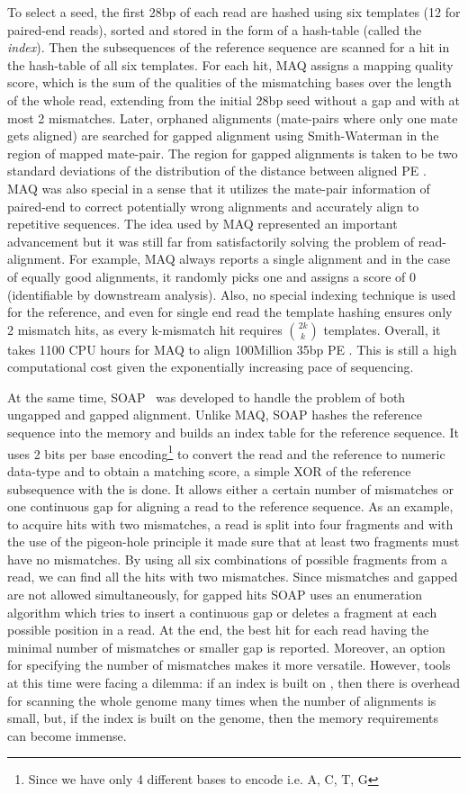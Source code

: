 To select a seed, the first 28bp of each read are hashed using six templates (12 for paired-end reads), sorted and stored in the form of a hash-table (called the \textit{index}). Then the subsequences of the reference sequence are scanned for a hit in the hash-table of all six templates. For each hit, MAQ assigns a mapping quality score, which is the sum of the qualities of the mismatching bases over the length of the whole read, extending from the initial 28bp seed without a gap and with at most 2 mismatches. Later, orphaned alignments (mate-pairs where only one mate gets aligned) are searched for gapped alignment using Smith-Waterman in the region of mapped mate-pair. The region for gapped alignments is taken to be two standard deviations of the distribution of the distance between aligned PE \reads. MAQ was also special in a sense that it utilizes the mate-pair information of paired-end \reads to correct potentially wrong alignments and accurately align \reads to repetitive sequences. The idea used by MAQ represented an important advancement but it was still far from satisfactorily solving the problem of read-alignment. For example, MAQ always reports a single alignment and in the case of equally good alignments, it randomly picks one and assigns a score of 0 (identifiable by downstream analysis). Also, no special indexing technique is used for the reference, and even for single end read the template hashing ensures only 2 mismatch hits, as every k-mismatch hit requires $\binom{2k}{k}$ templates. Overall, it takes 1100 CPU hours for MAQ to align 100Million 35bp PE \reads . This is still a high computational cost given the exponentially increasing pace of sequencing.

At the same time, SOAP~\citep{li2008soap} was developed to handle the problem of both ungapped and gapped alignment. Unlike MAQ, SOAP hashes the reference sequence into the memory and builds an index table for the reference sequence. It uses 2 bits per base encoding\footnote{Since we have only 4 different bases to encode i.e. A, C, T, G} to convert the read and the reference to numeric data-type and to obtain a matching score, a simple XOR of the reference subsequence with the \reads is done. It allows either a certain number of mismatches or one continuous gap for aligning a read to the reference sequence. As an example, to acquire hits with two mismatches, a read is split into four fragments and with the use of the pigeon-hole principle it made sure that at least two fragments must have no mismatches. By using all six combinations of possible fragments from a read, we can find all the hits with two mismatches. Since mismatches and gapped are not allowed simultaneously, for gapped hits SOAP uses an enumeration algorithm which tries to insert a continuous gap or deletes a fragment at each possible position in a read. At the end, the best hit for each read having the minimal number of mismatches or smaller gap is reported.  Moreover, an option for specifying the number of mismatches makes it more versatile. However, tools at this time were facing a dilemma: if an index is built on \reads, then there is overhead for scanning the whole genome many times when the number of alignments is small, but, if the index is built on the genome, then the memory requirements can become immense.

